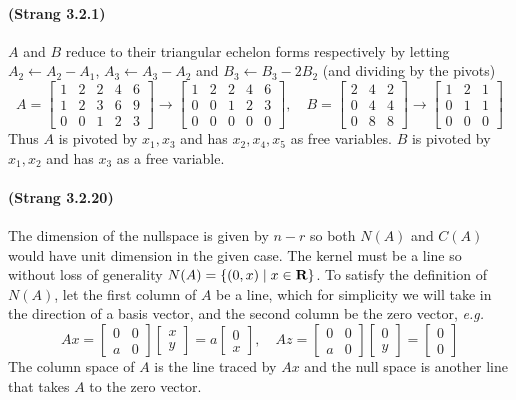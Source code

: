 \documentclass[10pt]{article}
\newcommand{\reals}{{\mbox{\bf R}}}
\newcommand{\eg}{{\it e.g.}}
\begin{document}
\paragraph{(Strang 3.2.1)}
$A$ and $B$ reduce to their triangular echelon forms respectively by letting $A_2\leftarrow A_2-A_1$, $A_3\leftarrow A_3-A_2$ and $B_3 \leftarrow B_3 - 2B_2$ (and dividing by the pivots)
\[A=
\begin{bmatrix}
1& 2& 2& 4& 6\\
1& 2& 3& 6& 9\\
0& 0& 1& 2& 3	
\end{bmatrix}\rightarrow
\begin{bmatrix}
1& 2& 2& 4& 6\\
0& 0& 1& 2& 3\\
0& 0& 0& 0& 0	
\end{bmatrix},\quad
B = \begin{bmatrix}
	2& 4& 2\\
	0& 4& 4\\
	0& 8& 8
\end{bmatrix}\rightarrow
\begin{bmatrix}
	1& 2& 1\\
	0& 1& 1\\
	0& 0& 0
\end{bmatrix}\]
Thus $A$ is pivoted by $x_1, x_3$ and has $x_2, x_4, x_5$ as free variables. $B$ is pivoted by $x_1, x_2$ and has $x_3$ as a free variable.

\paragraph{(Strang 3.2.20)} The dimension of the nullspace is given by $n-r$ so both $N(A)$ and $C(A)$ would have unit dimension in the given case. The kernel must be a line so without loss of generality $N(A) = \left\{(0, x)\mid x\in\reals\right\}$. To satisfy the definition of $N(A)$, let the first column of $A$ be a line, which for simplicity we will take in the direction of a basis vector, and the second column be the zero vector, \eg 
\[Ax = \begin{bmatrix}0& 0\\a& 0\end{bmatrix}\begin{bmatrix}x\\y\end{bmatrix}=a\begin{bmatrix}0\\x\end{bmatrix},\quad
Az=\begin{bmatrix}0& 0\\a& 0\end{bmatrix}\begin{bmatrix}0\\y\end{bmatrix} = \begin{bmatrix}0\\0\end{bmatrix}\]
The column space of $A$ is the line traced by $Ax$ and the null space is another line that takes $A$ to the zero vector.
\end{document}
